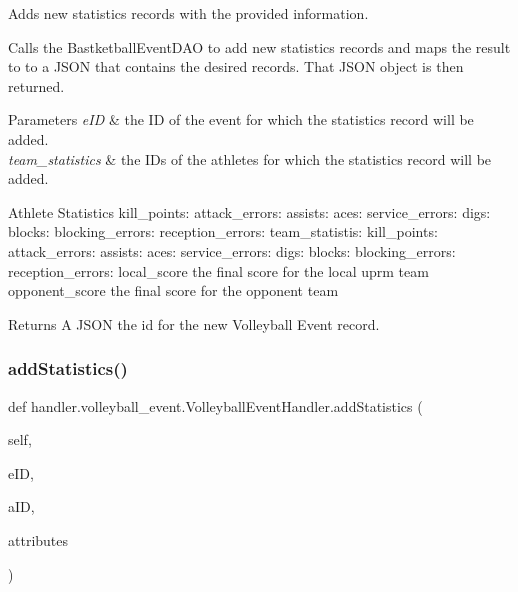 Adds new statistics records with the provided information. 

Calls the Bastketball\+Event\+D\+AO to add new statistics records and maps the result to to a J\+S\+ON that contains the desired records. That J\+S\+ON object is then returned.


\begin{DoxyParams}{Parameters}
{\em e\+ID} & the ID of the event for which the statistics record will be added. \\
\hline
{\em team\+\_\+statistics} & the I\+Ds of the athletes for which the statistics record will be added.\\
\hline
\end{DoxyParams}
\begin{DoxyParagraph}{Athlete Statistics}
kill\+\_\+points\+: attack\+\_\+errors\+: assists\+: aces\+: service\+\_\+errors\+: digs\+: blocks\+: blocking\+\_\+errors\+: reception\+\_\+errors\+: team\+\_\+statistis\+: kill\+\_\+points\+: attack\+\_\+errors\+: assists\+: aces\+: service\+\_\+errors\+: digs\+: blocks\+: blocking\+\_\+errors\+: reception\+\_\+errors\+: local\+\_\+score the final score for the local uprm team opponent\+\_\+score the final score for the opponent team
\end{DoxyParagraph}
\begin{DoxyReturn}{Returns}
A J\+S\+ON the id for the new Volleyball Event record. 
\end{DoxyReturn}
\mbox{\label{classhandler_1_1volleyball__event_1_1_volleyball_event_handler_a0cda68c5c05c8daf2296234ae1c89e87}} 
\subsubsection{\texorpdfstring{add\+Statistics()}{addStatistics()}}
{\footnotesize\ttfamily def handler.\+volleyball\+\_\+event.\+Volleyball\+Event\+Handler.\+add\+Statistics (\begin{DoxyParamCaption}\item[{}]{self,  }\item[{}]{e\+ID,  }\item[{}]{a\+ID,  }\item[{}]{attributes }\end{DoxyParamCaption})}



